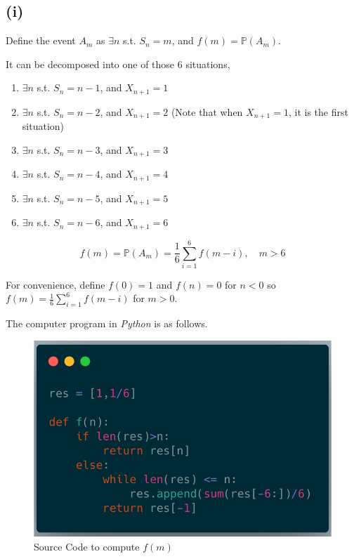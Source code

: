 \documentclass{article}
\begin{document}
\subsection{(i)}

Define the event $A_m$ as $\exists n$ s.t. $S_n = m$, and $f(m)=\mathbb{P}(A_m)$. 

It can be decomposed into one of those 6 situations,

\begin{enumerate}
    \item $\exists n$ s.t. $S_n = n-1$, and $X_{n+1} = 1$
    \item $\exists n$ s.t. $S_n = n-2$, and $X_{n+1} = 2$ (Note that when $X_{n+1} = 1$, it is the first situation)
    \item $\exists n$ s.t. $S_n = n-3$, and $X_{n+1} = 3$
    \item $\exists n$ s.t. $S_n = n-4$, and $X_{n+1} = 4$
    \item $\exists n$ s.t. $S_n = n-5$, and $X_{n+1} = 5$
    \item $\exists n$ s.t. $S_n = n-6$, and $X_{n+1} = 6$
\end{enumerate}

\begin{equation}
    f(m)= \mathbb{P}(A_m) =\frac 1 6 \sum_{i=1}^6 f(m-i),\quad m>6 
\end{equation}

For convenience, define $f(0) = 1$ and $f(n) = 0$ for $n<0$ so $f(m)=\frac 1 6 \sum_{i=1}^6 f(m-i)$ for $m>0$. 

The computer program in \textit{Python} is as follows.
\begin{figure}[htbp!]
    \centering
    \includegraphics[scale=0.3]{carbon.png}
    \caption{Source Code to compute $f(m)$}
    \label{fig:code}
\end{figure}
\end{document}
